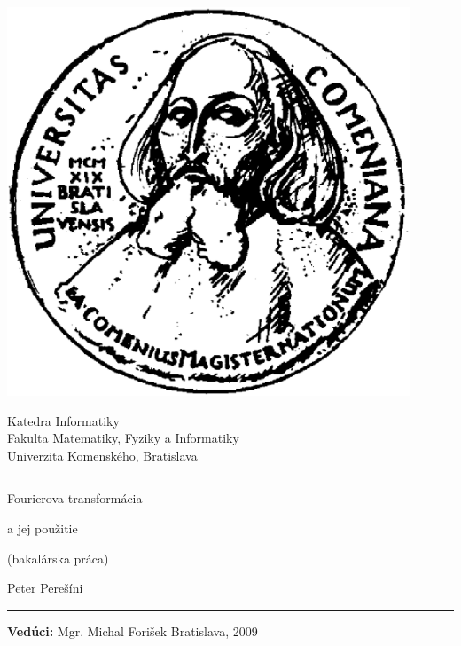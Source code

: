 \documentclass[12pt]{book}
\title{\mytitle}
\author{\myname}
\date{}
\def\mytitleone{Fourierova transformácia}
\def\mytitletwo{a jej použitie}
\def\myname{Peter Perešíni}
\def\myleader{Mgr. Michal Forišek}
\begin{document}
\frontmatter

\thispagestyle{empty}

\begin{minipage}{0.25\textwidth}
\includegraphics[width=0.9\textwidth]{obrazky/komlogo}
\end{minipage}
\begin{minipage}{0.69\textwidth}
\begin{center}
\sc Katedra Informatiky \\
Fakulta Matematiky, Fyziky a Informatiky \\
Univerzita Komenského, Bratislava
\end{center}
\end{minipage}

\vfill
\begin{center}
\begin{minipage}{0.8\textwidth}
\hrule
\bigskip\bigskip
\centerline{\LARGE\sc \mytitleone}
\bigskip
\centerline{\LARGE\sc \mytitletwo}
\smallskip
\centerline{(bakalárska práca)}
\bigskip
\bigskip
\centerline{\large\sc \myname}
\bigskip\bigskip
\hrule
\end{minipage}
\end{center}
\vfill
{\bf Vedúci:} \myleader
\hfill Bratislava, 2009
\eject %

\pagecolor{white}
\thispagestyle{empty}~\vfill\eject %

{~}\vspace{12cm}
\end{document}
